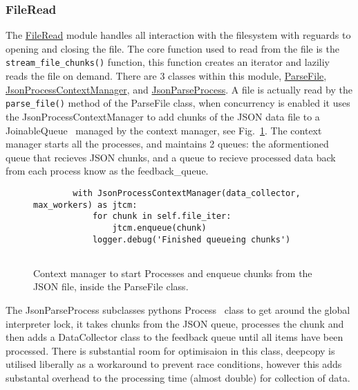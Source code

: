\documentclass[11pt]{article}
\newcommand{\code}[1]{\colorbox{light-gray}{\texttt{#1}}}
\begin{document}
\subsubsection{FileRead}\label{sec:FileRead}
The \href{https://www2.macs.hw.ac.uk/~sf52/DocuTrace/html/DocuTrace.Analysis.html#module-DocuTrace.Analysis.FileRead}{FileRead} module handles all interaction with the filesystem with reguards to opening and closing the file. The core function used to read from the file is the \code{stream\_file\_chunks()} function, this function creates an iterator and laziliy reads the file on demand. 
There are 3 classes within this module, \href{https://www2.macs.hw.ac.uk/~sf52/DocuTrace/html/DocuTrace.Analysis.html#DocuTrace.Analysis.FileRead.ParseFile}{ParseFile}, \href{https://www2.macs.hw.ac.uk/~sf52/DocuTrace/html/DocuTrace.Analysis.html#DocuTrace.Analysis.FileRead.JsonProcessContextManager}{JsonProcessContextManager}, and \href{https://www2.macs.hw.ac.uk/~sf52/DocuTrace/html/DocuTrace.Analysis.html#DocuTrace.Analysis.FileRead.ParseFile}{JsonParseProcess}. 
A file is actually read by the \code{parse\_file()} method of the ParseFile class, when concurrency is enabled it uses the JsonProcessContextManager to add chunks of the JSON data file to a JoinableQueue~\autocite{MultiprocessingProcessbasedParallelism} managed by the context manager, see Fig.~\ref{fig:JSONPContextManager}.
The context manager starts all the processes, and maintains 2 queues: the aformentioned queue that recieves JSON chunks, and a queue to recieve processed data back from each process know as the feedback\_queue.

\begin{figure}[h]
    \begin{verbatim}
        with JsonProcessContextManager(data_collector, max_workers) as jtcm:
            for chunk in self.file_iter:
                jtcm.enqueue(chunk)
            logger.debug('Finished queueing chunks')
        
    \end{verbatim}
    \caption{Context manager to start Processes and enqueue chunks from the JSON file, inside the ParseFile class.}
    \label{fig:JSONPContextManager}
\end{figure}

The JsonParseProcess subclasses pythons Process~\autocite{MultiprocessingProcessbasedParallelism} class to get around the global interpreter lock, it takes chunks from the JSON queue, processes the chunk and then adds a DataCollector class to the feedback queue until all items have been processed. 
There is substantial room for optimisaion in this class, deepcopy is utilised liberally as a workaround to prevent race conditions, however this adds substantal overhead to the processing time (almost double) for collection of data.
\end{document}
